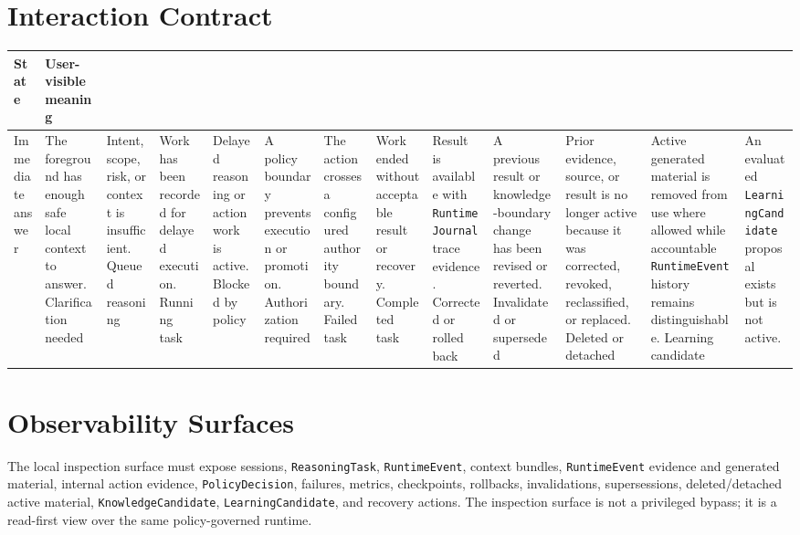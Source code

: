

\section{Interaction Contract}

\begin{tabularx}{.95\linewidth}{@{}lX@{}}
	\toprule
	\textbf{State} & \textbf{User-visible meaning} \\
	\midrule
	Immediate answer & The foreground has enough safe local context to answer. \N
	Clarification needed & Intent, scope, risk, or context is insufficient. \N
	Queued reasoning & Work has been recorded for delayed execution. \N
	Running task & Delayed reasoning or action work is active. \N
	Blocked by policy & A policy boundary prevents execution or promotion. \N
	Authorization required & The action crosses a configured authority boundary. \N
	Failed task & Work ended without acceptable result or recovery. \N
	Completed task & Result is available with \texttt{RuntimeJournal} trace evidence. \N
	Corrected or rolled back & A previous result or knowledge-boundary change
	has been revised or reverted. \N
	Invalidated or superseded & Prior evidence, source, or result is no longer
	active because it was corrected, revoked, reclassified, or replaced. \N
	Deleted or detached & Active generated material is removed from use where
	allowed while accountable \texttt{RuntimeEvent} history remains distinguishable. \N
	Learning candidate & An evaluated \texttt{LearningCandidate} proposal exists but is not active. \\
	\bottomrule
\end{tabularx}

\section{Observability Surfaces}

The local inspection surface must expose sessions, \texttt{ReasoningTask}, \texttt{RuntimeEvent}, context bundles, \texttt{RuntimeEvent} evidence and generated material, internal action evidence, \texttt{PolicyDecision}, failures, metrics, checkpoints, rollbacks, invalidations, supersessions, deleted/detached active material, \texttt{KnowledgeCandidate}, \texttt{LearningCandidate}, and recovery actions. The inspection surface is not a privileged bypass; it is a read-first view over the same policy-governed runtime.

